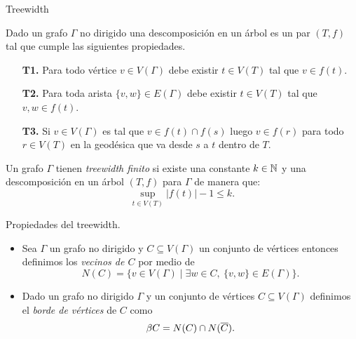 \documentclass[aspectratio=169, 11pt]{beamer}
\begin{document}
	\begin{frame}[fragile]{Treewidth}
		
		Dado un grafo $\Gamma$ no dirigido una descomposición en un árbol es un par $(T,f)$ tal que cumple las siguientes propiedades.
		
			\begin{enumerate}
				\item[\textbf{T1.}]
				 	Para todo vértice $v \in V(\Gamma)$ debe existir $t \in V(T)$ tal que $v \in f(t)$. 
				\item[\textbf{T2.}]
					Para toda arista $\{v,w\} \in E(\Gamma)$ 
					debe existir $t \in V(T)$ tal que $v,w \in f(t)$.
				\item[\textbf{T3.}] 
					Si $v \in V(\Gamma)$ es tal que $v \in f(t) \cap f(s)$ luego $v \in f(r)$ para todo $r \in V(T)$ en la geodésica que va desde $s$ a $t$ dentro de $T$.  
			\end{enumerate}
		
		Un grafo $\Gamma$ tienen \emph{treewidth finito} si existe una constante $k \in \mathbb{N}$ y una descomposición en un árbol $(T,f)$ para $\Gamma$ de manera que:
		\[
			\sup_{t \in V(T)} |f(t)| - 1 \le k.
		\]
		
		
	\end{frame}
	
	\begin{frame}[fragile]{Propiedades del treewidth.}
		\begin{itemize}
			\item 
				Sea $\Gamma$ un grafo no dirigido y $C \subseteq V(\Gamma)$ un conjunto de vértices entonces definimos los \emph{vecinos de $C$} por medio de 
				\[
				N(C) = \{ v \in V(\Gamma) \mid \exists w \in C, \ \{v,w \} \in E(\Gamma) \}.
				\]
			
			\item 
				Dado un grafo no dirigido $\Gamma$ y un conjunto de vértices $C \subseteq V(\Gamma)$ definimos el \emph{borde de vértices} de $C$ como
				\[
				\beta C =  N(C) \cap N(\overline{ C}).
				\] 
		\end{itemize}
		
		
		

	\end{frame}
	
\end{document}
